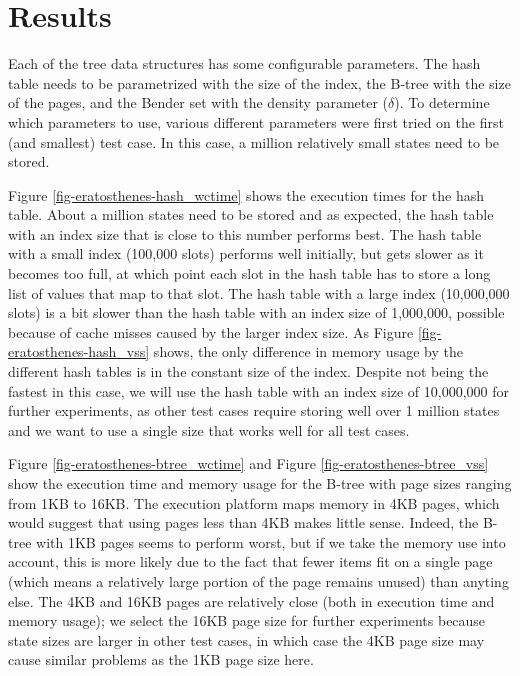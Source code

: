 \documentclass{acm_proc_article-sp}
\begin{document}

\section{Results}
Each of the tree data structures has some configurable parameters. The hash table
needs to be parametrized with the size of the index, the B-tree with the size of
the pages, and the Bender set with the density parameter ($\delta$). To determine
which parameters to use, various different parameters were first tried on the
first (and smallest) test case. In this case, a million relatively small states
need to be stored.

Figure \ref{fig-eratosthenes-hash_wctime} shows the execution times for the hash
table. About a million states need to be stored and as expected, the hash table
with an index size that is close to this number performs best. The hash table
with a small index (100,000 slots) performs well initially, but gets slower as
it becomes too full, at which point each slot in the hash table has to store a
long list of values that map to that slot.
The hash table with a large index (10,000,000 slots) is a bit slower than the hash
table with an index size of 1,000,000, possible because of cache misses caused by
the larger index size.
As Figure \ref{fig-eratosthenes-hash_vss} shows, the only difference in memory
usage by the different hash tables is in the constant size of the index.
Despite not being the fastest in this case, we will use the hash table with an
index size of 10,000,000 for further experiments, as other test cases require
storing well over 1 million states and we want to use a single size that works
well for all test cases.

Figure \ref{fig-eratosthenes-btree_wctime} and Figure
\ref{fig-eratosthenes-btree_vss} show the execution time and memory usage
for the B-tree with page sizes ranging from 1KB to 16KB. The execution platform
maps memory in 4KB pages, which would suggest that using pages less than 4KB
makes little sense. Indeed, the B-tree with 1KB pages seems to perform worst,
but if we take the memory use into account, this is more likely due to the fact
that fewer items fit on a single page (which means a relatively large portion of
the page remains unused) than anyting else.
The 4KB and 16KB pages are relatively close (both in execution time and memory
usage); we select the 16KB page size for further experiments because state sizes
are larger in other test cases, in which case the 4KB page size may cause similar
problems as the 1KB page size here.
\end{document}
